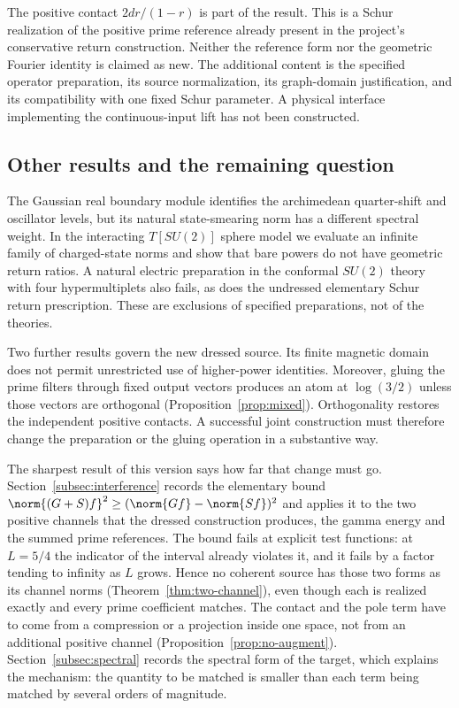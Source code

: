 The positive contact $2dr/(1-r)$ is part of the result. This is a Schur
realization of the positive prime reference already present in the
project's conservative return construction. Neither the reference form
nor the geometric Fourier identity is claimed as new. The additional
content is the specified operator preparation, its source normalization,
its graph-domain justification, and its compatibility with one fixed
Schur parameter. A physical interface implementing the continuous-input
lift has not been constructed.

\subsection{Other results and the remaining question}
The Gaussian real boundary module identifies the archimedean
quarter-shift and oscillator levels, but its natural state-smearing norm
has a different spectral weight. In the interacting $T[SU(2)]$ sphere
model we evaluate an infinite family of charged-state norms and show
that bare powers do not have geometric return ratios. A natural electric
preparation in the conformal $SU(2)$ theory with four hypermultiplets
also fails, as does the undressed elementary Schur return prescription.
These are exclusions of specified preparations, not of the theories.

Two further results govern the new dressed source. Its finite magnetic
domain does not permit unrestricted use of higher-power identities.
Moreover, gluing the prime filters through fixed output vectors produces
an atom at $\log(3/2)$ unless those vectors are orthogonal
(Proposition~\ref{prop:mixed}). Orthogonality restores the independent
positive contacts. A successful joint construction must therefore change
the preparation or the gluing operation in a substantive way.

The sharpest result of this version says how far that change must go.
Section~\ref{subsec:interference} records the elementary bound
$\norm{(G+S)f}^2\geq(\norm{Gf}-\norm{Sf})^2$ and applies it to the two
positive channels that the dressed construction produces, the gamma energy
and the summed prime references. The bound fails at explicit test functions:
at $L=5/4$ the indicator of the interval already violates it, and it fails
by a factor tending to infinity as $L$ grows. Hence no coherent source has
those two forms as its channel norms (Theorem~\ref{thm:two-channel}), even
though each is realized exactly and every prime coefficient matches. The
contact and the pole term have to come from a compression or a projection
inside one space, not from an additional positive channel
(Proposition~\ref{prop:no-augment}). Section~\ref{subsec:spectral} records
the spectral form of the target, which explains the mechanism: the quantity
to be matched is smaller than each term being matched by several orders of
magnitude.

